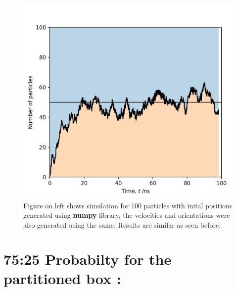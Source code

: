 \documentclass{article}
\begin{document}
\begin{figure}[H]
    \begin{minipage}[c]{0.5\textwidth}
    \includegraphics[width=\textwidth]{Figure_3b.png}
    \end{minipage}\hfill
    \begin{minipage}[c]{0.5\textwidth}
    \caption{
        Figure on left shows simulation for 100 particles with inital positions generated using 
        \textbf{numpy} library, the velocities and orientations were also generated using the same.
        Results are similar as seen before.
    } \label{fig:3b}
    \end{minipage}
\end{figure}

\section{75:25 Probabilty for the partitioned box :}
\end{document}
